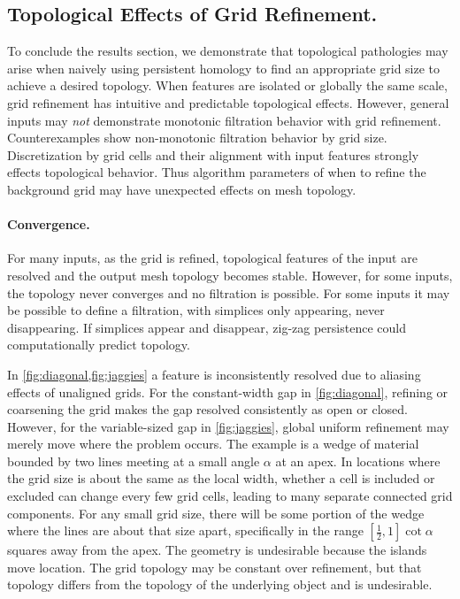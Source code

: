 \subsection{Topological Effects of Grid Refinement.}
To conclude the results section, we demonstrate that topological pathologies may arise when naively using persistent homology to find an appropriate grid size to achieve a desired topology.
When features are isolated or globally the same scale, grid refinement has intuitive and predictable topological effects. 
However, general inputs may \emph{not} demonstrate monotonic filtration behavior with grid refinement. 
Counterexamples show non-monotonic filtration behavior by grid size. Discretization by grid cells and their alignment with input features strongly effects topological behavior. Thus algorithm parameters of when to refine the background grid may have unexpected effects on mesh topology. 

\paragraph{Convergence.}
For many inputs, as the grid is refined, topological features of the input are resolved and the output mesh topology becomes stable. 
However, for some inputs, the topology never converges and no filtration is possible.
For some inputs it may be possible to define a filtration, with simplices only appearing, never disappearing. 
If simplices appear and disappear, zig-zag persistence could computationally predict topology. 


In \cref{fig:diagonal,fig:jaggies} a feature is inconsistently resolved due to aliasing effects of unaligned grids. 
For the constant-width gap in \cref{fig:diagonal}, refining or coarsening the grid makes the gap resolved consistently as open or closed.
However, for the variable-sized gap in \cref{fig:jaggies}, global uniform refinement may merely move where the problem occurs. 
The example is a wedge of material bounded by two lines meeting at a small angle $\alpha$ at an apex. 
In locations where the grid size is about the same as the local width, whether a cell is included or excluded can change every few grid cells, leading to many separate connected grid components. 
For any small grid size, there will be some portion of the wedge where the lines are about that  size apart, specifically in the range $[\frac{1}{2},1] \cot \alpha$ squares away from the apex.
The geometry is undesirable because the islands move location. 
The grid topology may be constant over refinement, but that topology differs from the topology of the underlying object and is undesirable.


